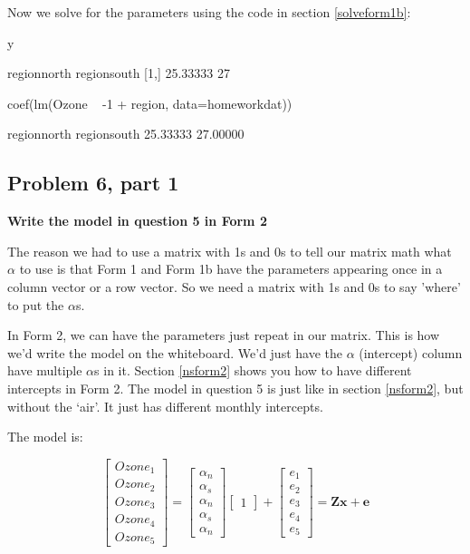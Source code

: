 Now we solve for the parameters using the code in section \ref{solveform1b}:
\begin{Schunk}
\begin{Sinput}
 y%*%t(d)%*%solve(d%*%t(d))
\end{Sinput}
\begin{Soutput}
     regionnorth regionsouth
[1,]    25.33333          27
\end{Soutput}
\begin{Sinput}
 coef(lm(Ozone ~ -1 + region, data=homeworkdat))
\end{Sinput}
\begin{Soutput}
regionnorth regionsouth 
   25.33333    27.00000 
\end{Soutput}
\end{Schunk}

\subsection*{Problem 6, part 1}
{\bf Write the model in question 5 in Form 2} 

The reason we had to use a matrix with 1s and 0s to tell our matrix math what $\alpha$ to use is that Form 1 and Form 1b have the parameters appearing once in a column vector or a row vector.  So we need a matrix with 1s and 0s to say 'where' to put the $\alpha$s. 

In Form 2, we can have the parameters just repeat in our matrix.  This is how we'd write the model on the whiteboard.  We'd just have the $\alpha$ (intercept) column have multiple $\alpha$s in it.  Section \ref{nsform2} shows you how to have different intercepts in Form 2.  The model in question 5 is just like in section \ref{nsform2}, but without the `air'.  It just has different monthly intercepts.

The model is:

$$
\begin{bmatrix} Ozone_1 \\ Ozone_2  \\ Ozone_3 \\ Ozone_4 \\ Ozone_5 \end{bmatrix}
= 
\begin{bmatrix}
\alpha_n\\
\alpha_s\\
\alpha_n \\
\alpha_s \\
\alpha_n
\end{bmatrix}\begin{bmatrix}1\end{bmatrix}
+
\begin{bmatrix} e_1\\ e_2\\ e_3 \\ e_4 \\ e_5\end{bmatrix}=\mathbf{Z}\mathbf{x}+\mathbf{e}
$$

